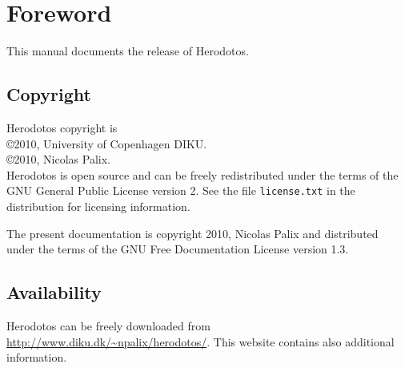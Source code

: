 
\chapter*{Foreword}

This manual documents the release \version of Herodotos.


\section*{Copyright}

Herodotos copyright is\\
\copyright 2010, University of Copenhagen DIKU.\\
\copyright 2010, Nicolas Palix.\\

Herodotos is open source and can be freely redistributed under the
terms of the GNU General Public License version 2. See the file
\texttt{license.txt} in the distribution for licensing information.

The present documentation is copyright 2010, Nicolas Palix and
distributed under the terms of the GNU Free Documentation License
version 1.3.

\section*{Availability}

Herodotos can be freely downloaded
from \url{http://www.diku.dk/~npalix/herodotos/}.
This website contains also additional information.



